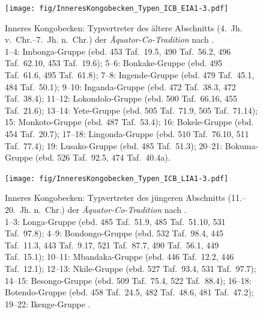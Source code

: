\begin{figure}[p]
	\centering
	\texttt{[image: fig/InneresKongobecken\_Typen\_ICB\_EIA1-3.pdf]}
	\caption{Inneres Kongobecken: Typvertreter des ältere Abschnitts (4.~Jh. v.~Chr.--7.~Jh. n.~Chr.)  der \textit{Äquator-Co-Tradition} nach \textcite{Wotzka.1995}.\\1--4: Imbonga-Gruppe (ebd. 453 Taf.~19.5, 490 Taf.~56.2, 496 Taf.~62.10, 453 Taf.~19.6); 5--6: Bonkake-Gruppe (ebd. 495 Taf.~61.6, 495 Taf.~61.8); 7--8: Ingende-Gruppe (ebd. 479 Taf.~45.1, 484 Taf.~50.1); 9--10: Inganda-Gruppe (ebd. 472 Taf.~38.3, 472 Taf.~38.4); 11--12: Lokondolo-Gruppe (ebd. 500 Taf.~66.16, 455 Taf.~21.6); 13--14: Yete-Gruppe (ebd. 505 Taf.~71.9, 505 Taf.~71.14); 15: Monkoto-Gruppe (ebd. 487 Taf.~53.4); 16: Bokele-Gruppe (ebd. 454 Taf.~20.7); 17--18: Lingonda-Gruppe (ebd. 510 Taf.~76.10, 511 Taf.~77.4); 19: Lusako-Gruppe (ebd. 485 Taf.~51.3); 20--21: Bokuma-Gruppe (ebd. 526 Taf.~92.5, 474 Taf.~40.4a).}
	\label{fig:Wotzka1995_TypenICB_EIA1}
\end{figure}

\begin{figure}[tb!]
	\centering
	\texttt{[image: fig/InneresKongobecken\_Typen\_ICB\_LIA1-3.pdf]}
	\caption{Inneres Kongobecken: Typvertreter des jüngeren Abschnitts (11.--20.~Jh. n.~Chr.) der \textit{Äquator-Co-Tradition} nach \textcite{Wotzka.1995}.\\1--3: Longa-Gruppe (ebd. 485 Taf.~51.9, 485 Taf.~51.10, 531 Taf.~97.8); 4--9: Bondongo-Gruppe (ebd. 532 Taf.~98.4, 445 Taf.~11.3, 443 Taf.~9.17, 521 Taf.~87.7, 490 Taf.~56.1, 449 Taf.~15.1); 10--11: Mbandaka-Gruppe (ebd. 446 Taf.~12.2, 446 Taf.~12.1); 12--13: Nkile-Gruppe (ebd. 527 Taf.~93.4, 531 Taf.~97.7); 14--15: Besongo-Gruppe (ebd. 509 Taf.~75.4, 522 Taf.~88.4); 16--18: Botendo-Gruppe (ebd. 458 Taf.~24.5, 482 Taf.~48.6, 481 Taf.~47.2); 19--22: Ikenge-Gruppe \parencite[427 Abb.~23.5, 426 Abb.~22.1a--b, 428 Abb.~24.2, 429 Abb.~25.2]{Eggert.1980c}.}
	\label{fig:Wotzka1995_TypenICB_LIA1}
\end{figure}

